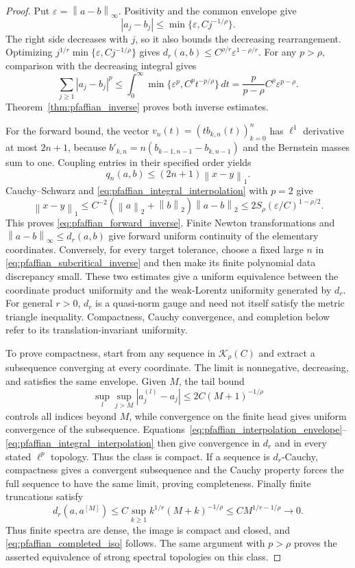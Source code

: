 \documentclass[11pt,a4paper]{amsart}
\numberwithin{equation}{section}
\theoremstyle{definition}
\theoremstyle{remark}
\newcommand{\norm}[1]{\left\lVert#1\right\rVert}
\begin{document}
\begin{proof}
Put $\varepsilon=\norm{a-b}_\infty$. Positivity and the common envelope give
\begin{equation}\label{eq:pfaffian_interpolation_envelope}
 |a_j-b_j|\le\min\{\varepsilon,Cj^{-1/\rho}\}.
\end{equation}
The right side decreases with $j$, so it also bounds the decreasing rearrangement. Optimizing $j^{1/r}\min\{\varepsilon,Cj^{-1/\rho}\}$ gives
$d_r(a,b)\le C^{\rho/r}\varepsilon^{1-\rho/r}$.
For any $p>\rho$, comparison with the decreasing integral gives
\begin{equation}\label{eq:pfaffian_integral_interpolation}
 \sum_{j\ge1}|a_j-b_j|^p
 \le\int_0^\infty\min\{\varepsilon^p,C^pt^{-p/\rho}\}\,dt
 =\frac{p}{p-\rho}C^\rho\varepsilon^{p-\rho}.
\end{equation}
Theorem~\ref{thm:pfaffian_inverse} proves both inverse estimates.

For the forward bound, the vector $v_n(t)=(tb_{k,n}(t))_{k=0}^n$ has $\ell^1$ derivative at most $2n+1$, because
$b'_{k,n}=n(b_{k-1,n-1}-b_{k,n-1})$ and the Bernstein masses sum to one. Coupling entries in their specified order yields
\[
 q_n(a,b)\le(2n+1)\norm{x-y}_1.
\]
Cauchy--Schwarz and \eqref{eq:pfaffian_integral_interpolation} with $p=2$ give
\[
 \norm{x-y}_1
 \le C^{-2}(\norm a_2+\norm b_2)\norm{a-b}_2
 \le2S_\rho(\varepsilon/C)^{1-\rho/2}.
\]
This proves \eqref{eq:pfaffian_forward_inverse}. Finite Newton transformations and $\norm{a-b}_\infty\le d_r(a,b)$ give forward uniform continuity of the elementary coordinates. Conversely, for every target tolerance, choose a fixed large $n$ in \eqref{eq:pfaffian_subcritical_inverse} and then make its finite polynomial data discrepancy small. These two estimates give a uniform equivalence between the coordinate product uniformity and the weak-Lorentz uniformity generated by $d_r$. For general $r>0$, $d_r$ is a quasi-norm gauge and need not itself satisfy the metric triangle inequality. Compactness, Cauchy convergence, and completion below refer to its translation-invariant uniformity.

To prove compactness, start from any sequence in $\mathcal K_\rho(C)$ and extract a subsequence converging at every coordinate. The limit is nonnegative, decreasing, and satisfies the same envelope. Given $M$, the tail bound
\[
 \sup_l\sup_{j>M}|a_j^{(l)}-a_j|\le 2C(M+1)^{-1/\rho}
\]
controls all indices beyond $M$, while convergence on the finite head gives uniform convergence of the subsequence. Equations~\eqref{eq:pfaffian_interpolation_envelope}--\eqref{eq:pfaffian_integral_interpolation} then give convergence in $d_r$ and in every stated $\ell^p$ topology. Thus the class is compact. If a sequence is $d_r$-Cauchy, compactness gives a convergent subsequence and the Cauchy property forces the full sequence to have the same limit, proving completeness. Finally finite truncations satisfy
\[
 d_r(a,a^{[M]})\le C\sup_{k\ge1}k^{1/r}(M+k)^{-1/\rho}
 \le CM^{1/r-1/\rho}\longrightarrow0.
\]
Thus finite spectra are dense, the image is compact and closed, and \eqref{eq:pfaffian_completed_iso} follows. The same argument with $p>\rho$ proves the asserted equivalence of strong spectral topologies on this class.
\end{proof}
\end{document}
